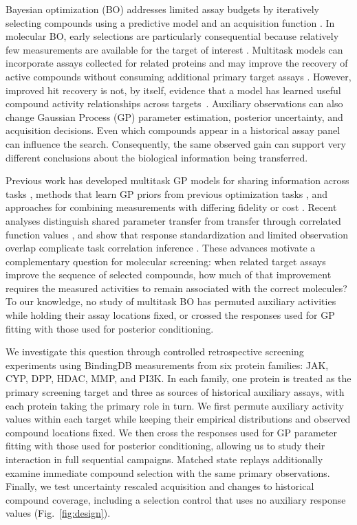 \documentclass[10pt,letterpaper,runningheads]{llncs}
\begin{document}
Bayesian optimization (BO) addresses limited assay budgets by iteratively selecting compounds using a predictive model and an acquisition function \cite{jones1998ego,shahriari2016taking,hie2020leveraging,bellamy2022batched}. In molecular BO, early selections are particularly consequential because relatively few measurements are available for the target of interest \cite{graff2021accelerating,gao2022pmo}. Multitask models can incorporate assays collected for related proteins and may improve the recovery of active compounds without consuming additional primary target assays \cite{zhao2020multitask,swersky2013multitask,ramsundar2015massively}. However, improved hit recovery is not, by itself, evidence that a model has learned useful compound activity relationships across targets~\cite{xu2017demystifying}. Auxiliary observations can also change Gaussian Process (GP) parameter estimation, posterior uncertainty, and acquisition decisions. Even which compounds appear in a historical assay panel can influence the search. Consequently, the same observed gain can support very different conclusions about the biological information being transferred.

Previous work has developed multitask GP models for sharing information across tasks \cite{bonilla2007multitask,swersky2013multitask,tighineanu2021transfer}, methods that learn GP priors from previous optimization tasks \cite{wang2024hyperbo}, and approaches for combining measurements with differing fidelity or cost \cite{mcdonald2025multifidelity}. Recent analyses distinguish shared parameter transfer from transfer through correlated function values \cite{sedgwick2025transfer}, and show that response standardization and limited observation overlap complicate task correlation inference \cite{hvarfner2026pitfalls}. These advances motivate a complementary question for molecular screening: when related target assays improve the sequence of selected compounds, how much of that improvement requires the measured activities to remain associated with the correct molecules? To our knowledge, no study of multitask BO has permuted auxiliary activities while holding their assay locations fixed, or crossed the responses used for GP fitting with those used for posterior conditioning.

We investigate this question through controlled retrospective screening experiments using BindingDB measurements \cite{bindingdb2016} from six protein families: JAK, CYP, DPP, HDAC, MMP, and PI3K. In each family, one protein is treated as the primary screening target and three as sources of historical auxiliary assays, with each protein taking the primary role in turn. We first permute auxiliary activity values within each target while keeping their empirical distributions and observed compound locations fixed. We then cross the responses used for GP parameter fitting with those used for posterior conditioning, allowing us to study their interaction in full sequential campaigns. Matched state replays additionally examine immediate compound selection with the same primary observations. Finally, we test uncertainty rescaled acquisition and changes to historical compound coverage, including a selection control that uses no auxiliary response values (Fig.~\ref{fig:design}).
\end{document}
